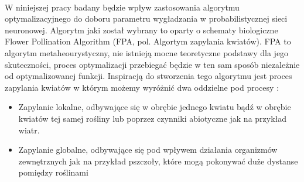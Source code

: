 \documentclass[a4paper,12pt,twoside]{article}
\begin{document}
\paragraph{}
W niniejszej pracy badany będzie wpływ zastosowania algorytmu optymalizacyjnego do doboru parametru wygładzania w probabilistycznej sieci neuronowej. Algorytm jaki został wybrany to oparty o schematy biologiczne Flower Pollination Algorithm (FPA, pol. Algortym zapylania kwiatów). FPA to algorytm metaheourystyczny, nie istnieją mocne teoretyczne podstawy dla jego skuteczności, proces optymalizacji przebiegać będzie w ten sam sposób niezależnie od optymalizowanej funkcji.  Inspiracją do stworzenia tego algorytmu jest proces zapylania kwiatów w którym możemy wyróżnić dwa oddzielne pod procesy \cite{FPA}:
\begin{itemize}
\item Zapylanie lokalne, odbywające się w obrębie jednego kwiatu bądź w obrębie kwiatów tej samej rośliny lub poprzez czynniki abiotyczne jak na przykład wiatr. 
\item Zapylanie globalne, odbywające się pod wpływem działania organizmów zewnętrznych jak na przykład pszczoły, które mogą pokonywać duże dystanse pomiędzy roślinami
\end{itemize}
\end{document}
